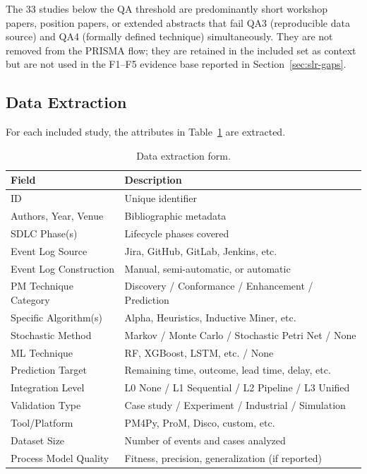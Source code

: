 

The 33 studies below the QA threshold are predominantly short workshop papers,
position papers, or extended abstracts that fail QA3 (reproducible data
source) and QA4 (formally defined technique) simultaneously. They are not
removed from the PRISMA flow; they are retained in the included set as
context but are not used in the F1--F5 evidence base reported in
Section~\ref{sec:slr-gaps}.


\subsection{Data Extraction}
\label{sec:slr-extraction}

For each included study, the attributes in Table~\ref{tab:extraction} are
extracted.

\begin{table}[htbp]
\centering
\caption{Data extraction form.}
\label{tab:extraction}
\small
\setlength{\tabcolsep}{4pt}
\begin{tabular}{p{3.6cm} p{8.1cm}}
\toprule
\textbf{Field} & \textbf{Description} \\
\midrule
ID                           & Unique identifier \\
Authors, Year, Venue         & Bibliographic metadata \\
SDLC Phase(s)                & Lifecycle phases covered \\
Event Log Source             & Jira, GitHub, GitLab, Jenkins, etc. \\
Event Log Construction       & Manual, semi-automatic, or automatic \\
PM Technique Category        & Discovery / Conformance / Enhancement / Prediction \\
Specific Algorithm(s)        & Alpha, Heuristics, Inductive Miner, etc. \\
Stochastic Method            & Markov / Monte Carlo / Stochastic Petri Net / None \\
ML Technique                 & RF, XGBoost, LSTM, etc. / None \\
Prediction Target            & Remaining time, outcome, lead time, delay, etc. \\
Integration Level            & L0 None / L1 Sequential / L2 Pipeline / L3 Unified \\
Validation Type              & Case study / Experiment / Industrial / Simulation \\
Tool/Platform                & PM4Py, ProM, Disco, custom, etc. \\
Dataset Size                 & Number of events and cases analyzed \\
Process Model Quality        & Fitness, precision, generalization (if reported) \\
\bottomrule
\end{tabular}
\end{table}


